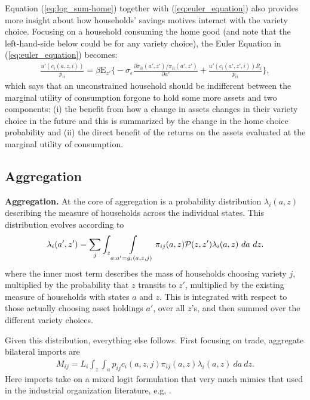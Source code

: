 \documentclass[12pt,pdftex]{article}
\begin{document}
\begin{onehalfspacing}
Equation (\ref{eq:log_sum-home}) together with (\ref{eq:euler_equation}) also provides more insight about how households' savings motives interact with the variety choice. Focusing on a household consuming the home good (and note that the left-hand-side below could be for any variety choice), the Euler Equation in (\ref{eq:euler_equation}) becomes:
\begin{align}
\frac{u'(c_{i}(a,z,i))}{p_{ii}} = \beta \mathrm{E}_{z'} \bigg \{ -\sigma_{\epsilon} \frac{\partial \pi_{ii}(a',z') / \pi_{ii}(a',z')}{\partial a'} + \frac{u'(c_{i}(a',z',i))R_i}{p_{ii}} \bigg \},
\label{eq:euler_equation-home}
\end{align}
which says that an unconstrained household should be indifferent between the marginal utility of consumption forgone to hold some more assets and two components: (i) the benefit from how a change in assets changes in their variety choice in the future and this is summarized by the change in the home choice probability and (ii) the direct benefit of the returns on the assets evaluated at the marginal utility of consumption.

\subsection{Aggregation}

\textbf{Aggregation.} At the core of aggregation is a probability distribution $\lambda_{i}(a, z)$ describing the measure of households across the individual states. This distribution evolves according to
\begin{align}
\lambda_i(a', z') = \sum_{j} \int_{z}\int\displaylimits_{a: a' = g_{i}(a, z, j)} \pi_{ij}(a, z) \mathcal{P}(z, z') \lambda_i(a, z) \ da \ dz.
\label{eq:law_motion}
\end{align}
where the inner most term describes the mass of households choosing variety $j$, multiplied by the probability that $z$ transits to $z'$, multiplied by the existing measure of households with states $a$ and $z$. This is integrated with respect to those actually choosing asset holdings $a'$, over all $z$'s, and then summed over the different variety choices.

Given this distribution, everything else follows. First focusing on trade, aggregate bilateral imports are
\begin{align}
M_{ij} = L_i \int_{z} \int_{a}  p_{ij} c_{i}(a, z, j) \pi_{ij}(a, z) \lambda_i(a, z) \ da \ dz.
\label{eq:imports}
\end{align}
Here imports take on a mixed logit formulation that very much mimics that used in the industrial organization literature, e.g, \citet*{berry1995automobile}.


\end{onehalfspacing}
\end{document}
